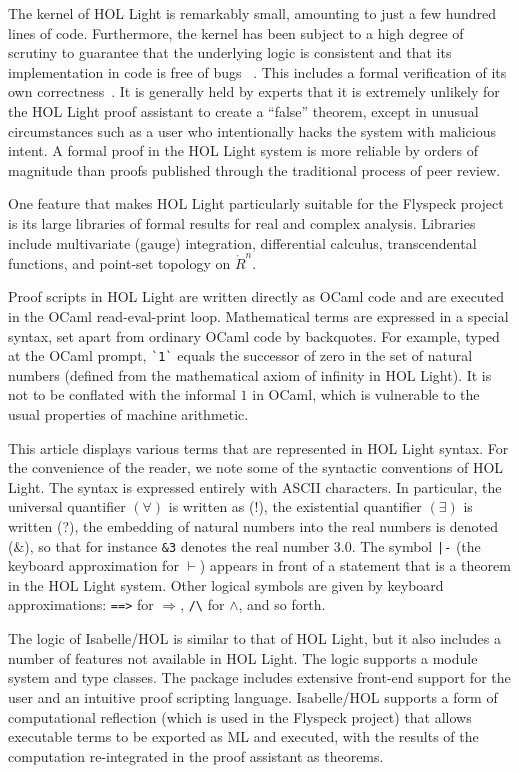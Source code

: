 The kernel of HOL Light is remarkably small, amounting to just a few
hundred lines of code.  Furthermore, the kernel has been subject to a
high degree of scrutiny to guarantee that the underlying logic is
consistent and that its implementation in code is free of
bugs~\cite{DBLP:conf/itp/KumarAMO14} \cite{hales-bourbaki2014}.  This
includes a formal verification of its own
correctness~\cite{DBLP:conf/cade/Harrison06}.  It is generally held by
experts that it is extremely unlikely for the HOL Light proof
assistant to create a ``false'' theorem, except in unusual
circumstances such as a user who intentionally hacks the system with
malicious intent.  A formal proof in the HOL Light system is more
reliable by orders of magnitude than proofs published through the
traditional process of peer review.

One feature that makes HOL Light particularly suitable for the
Flyspeck project is its large libraries of formal results for real and
complex analysis.  Libraries include multivariate (gauge) integration,
differential calculus, transcendental functions, and point-set
topology on $\ring{R}^n$.

Proof scripts in HOL Light are written directly as OCaml code and
are executed in the OCaml read-eval-print loop.  Mathematical
terms are expressed in a special syntax, set apart from ordinary OCaml
code by backquotes.  For example, typed at the OCaml prompt,
\verb!`1`!  equals the successor of zero in the set of natural numbers
(defined from the mathematical axiom of infinity in HOL Light).
It is not to be conflated with the informal $1$ in OCaml, which is
vulnerable to the usual properties of machine arithmetic.

This article displays various terms that are represented in HOL Light
syntax.  For the convenience of the reader, we note some of the
syntactic conventions of HOL Light.  The syntax is expressed entirely
with ASCII characters.  In particular, the universal
quantifier $(\forall)$ is written as (!), the existential quantifier
$(\exists)$ is written (?), the embedding of natural numbers into the
real numbers is denoted (\&), so that for instance \verb!&3! denotes
the real number $3.0$.  The symbol \verb!|-! (the keyboard
approximation for $\vdash$) appears in front of a statement that is a
theorem in the HOL Light system.  Other logical symbols are given by
keyboard approximations: \verb!==>! for $\Longrightarrow$, \verb!/\!
for $\land$, and so forth.

The logic of Isabelle/HOL is similar to that of HOL Light, but it
also includes a number of features not available in HOL Light.  The logic
supports a module system and type classes.  The package includes
extensive front-end support for the user and an intuitive proof
scripting language.  Isabelle/HOL supports a form of computational
reflection (which is used in the Flyspeck project) that allows
executable terms to be exported as ML and executed, with the results
of the computation re-integrated in the proof assistant as theorems.



